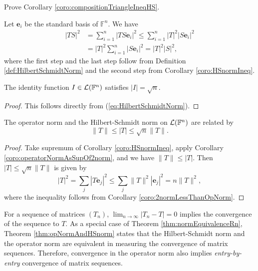 \begin{exc}
  Prove Corollary \ref{coro:compositionTriangleIneqHS}.
\end{exc}
\begin{solution}
  Let $\mathbf{e}_i$ be the standard basis of $\mathbb{F}^n$. We have
  \begin{align*}
    |TS|^2 &= \sum\limits_{i = 1}^n|TS\mathbf{e}_i|^2
             \leq \sum\limits_{i = 1}^n|T|^2|S\mathbf{e}_i|^2
    \\
           &= |T|^2\sum\limits_{i = 1}^n|S\mathbf{e}_i|^2
             = |T|^2|S|^2, 
  \end{align*}
  where the first step and the last step follow
  from Definition \ref{def:HilbertSchmidtNorm}
  and the second step from Corollary \ref{coro:HSnormIneq}. 
\end{solution}


\begin{coro}
  The identity function $I\in {\cal L}(\mathbb{F}^n)$
  satisfies $|I|=\sqrt{n}$.
\end{coro}
\begin{proof}
  This follows directly from (\ref{eq:HilbertSchmidtNorm}).
\end{proof}

\begin{thm}
  \label{thm:opNormAndHSnorm}
  The operator norm and the Hilbert-Schmidt norm
  on ${\cal L}(\mathbb{F}^n)$
  are related by
  \begin{equation}
    \label{eq:opNormAndHSnorm}
    \|T\| \le |T| \le \sqrt{n} \|T\|.
  \end{equation}
\end{thm}
\begin{proof}
  Take supremum of Corollary \ref{coro:HSnormIneq},
  apply Corollary \ref{coro:operatorNormAsSupOf2norm},
  and we have $\|T\| \le |T|$.
  Then $|T| \le \sqrt{n} \|T\|$ is given by
  \begin{displaymath}
    |T|^2 = \sum_j |T \mathbf{e}_j|^2
    \le \sum_j \|T\|^2 |\mathbf{e}_j|^2 = n \|T\|^2,
  \end{displaymath}
  where the inequality follows from
  Corollary \ref{coro:2normLessThanOpNorm}.
\end{proof}

\begin{rem}
  For a sequence of matrices $(T_n)$,
  $\lim_{n\rightarrow \infty}|T_n-T|=0$
  implies the convergence of the sequence to $T$.
  As a special case of Theorem \ref{thm:normEquivalenceRn}, 
  Theorem \ref{thm:opNormAndHSnorm} states that 
  the Hilbert-Schmidt norm and the operator norm are equivalent
  in measuring the convergence of matrix sequences.
  Therefore,
  convergence in the operator norm
  also implies \emph{entry-by-entry} convergence
  of matrix sequences.
\end{rem}

